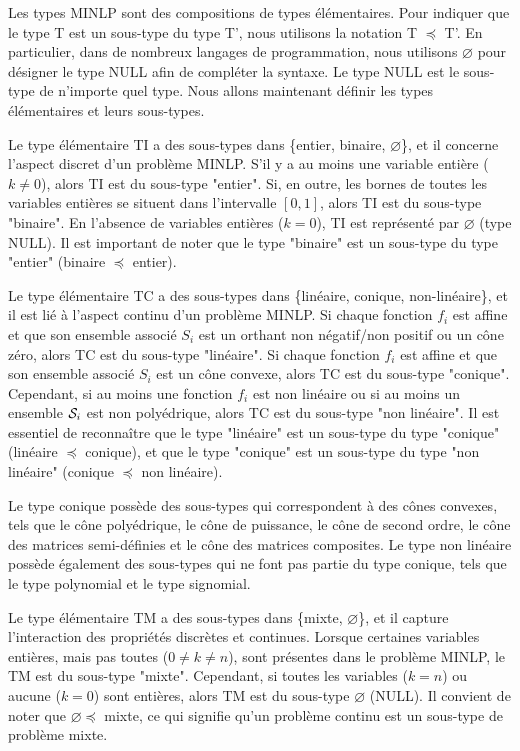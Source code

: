 Les types MINLP sont des compositions de types élémentaires. Pour indiquer que le type T est un sous-type du type T', nous utilisons la notation T $\preceq $ T'. En particulier, dans de nombreux langages de programmation, nous utilisons $\varnothing$ pour désigner le type NULL afin de compléter la syntaxe. Le type NULL est le sous-type de n'importe quel type. Nous allons maintenant définir les types élémentaires et leurs sous-types.



Le type élémentaire TI a des sous-types dans \{entier, binaire, $\varnothing$\}, et il concerne l'aspect discret d'un problème MINLP. S'il y a au moins une variable entière ($k\ne 0$), alors TI est du sous-type "entier". Si, en outre, les bornes de toutes les variables entières se situent dans l'intervalle $[0, 1]$, alors TI est du sous-type "binaire". En l'absence de variables entières ($k=0$), TI est représenté par $\varnothing$ (type NULL). Il est important de noter que le type "binaire" est un sous-type du type "entier" (binaire $\preceq $ entier).

Le type élémentaire TC a des sous-types dans \{linéaire, conique, non-linéaire\}, et il est lié à l'aspect continu d'un problème MINLP. Si chaque fonction $f_i$ est affine et que son ensemble associé $S_i$ est un orthant non négatif/non positif ou un cône zéro, alors TC est du sous-type "linéaire". Si chaque fonction $f_i$ est affine et que son ensemble associé $S_i$ est un cône convexe, alors TC est du sous-type "conique". Cependant, si au moins une fonction $f_i$ est non linéaire ou si au moins un ensemble $\mathcal S_i$ est non polyédrique, alors TC est du sous-type "non linéaire". Il est essentiel de reconnaître que le type "linéaire" est un sous-type du type "conique" (linéaire $\preceq $ conique), et que le type "conique" est un sous-type du type "non linéaire" (conique $\preceq $ non linéaire).


Le type conique possède des sous-types qui correspondent à des cônes convexes, tels que le cône polyédrique, le cône de puissance, le cône de second ordre, le cône des matrices semi-définies et le cône des matrices composites. Le type non linéaire possède également des sous-types qui ne font pas partie du type conique, tels que le type polynomial et le type signomial.


Le type élémentaire TM a des sous-types dans \{mixte, $\varnothing$\}, et il capture l'interaction des propriétés discrètes et continues. Lorsque certaines variables entières, mais pas toutes ($0 \ne k \ne n$), sont présentes dans le problème MINLP, le TM est du sous-type "mixte". Cependant, si toutes les variables ($k = n$) ou aucune ($k = 0$) sont entières, alors TM est du sous-type $\varnothing$ (NULL). Il convient de noter que $\varnothing \preceq$ mixte, ce qui signifie qu'un problème continu est un sous-type de problème mixte.

